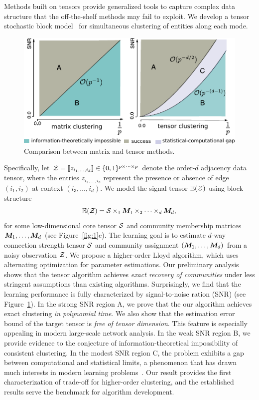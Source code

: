 \documentclass[10pt]{article}
\theoremstyle{plain}
\theoremstyle{definition}
\begin{document}
Methods built on tensors provide generalized tools to capture complex data structure that the off-the-shelf methods may fail to exploit. We develop a tensor stochastic block model~\cite{wang2019multiway,han2020exact} for simultaneous clustering of entities along each mode. 
\begin{figure}
  \vspace{-.3cm}
  \begin{center}
    \includegraphics[width=.4\textwidth]{demo_snr.pdf}
  \end{center}
          \vspace{-.2cm}
    \caption{\scriptsize Comparison between matrix and tensor methods.}\label{fig:2}
        \vspace{-.4cm}
\end{figure} 
Specifically, let $\mathcal{Z}=\llbracket z_{i_1,\ldots,i_d} \rrbracket\in\{0,1\}^{p\times \cdots \times p}$ denote the order-$d$ adjacency data tensor, where the entries $z_{i_1,\ldots,i_d}$ represent the presence or absence of edge $(i_1,i_2)$ at context $(i_3,\ldots,i_d)$. We model the signal tensor $\mathbb{E}(\mathcal{Z})$ using block structure
\[
\mathbb{E}(\mathcal{Z})=\mathcal{S}\times_1\bm M_1\times_2\cdots \times_d\bm M_d,
\]
for some low-dimensional core tensor $\mathcal{S}$ and community membership matrices $\bm M_1,\ldots,\bm M_d$ (see Figure~\ref{fig:1}c). The learning goal is to estimate $d$-way connection strength tensor $\mathcal{S}$ and community assignment $(\bm M_1,\ldots,\bm M_d)$ from a noisy observation $\mathcal{Z}$. We propose a higher-order Lloyd algorithm, which uses alternating optimization for parameter estimations. Our preliminary analysis shows that the tensor algorithm achieves \emph{exact recovery of communities} under less stringent assumptions than existing algorithms. Surprisingly, we find that the learning performance is fully characterized by signal-to-noise ration (SNR) (see Figure~\ref{fig:2}). In the strong SNR region A, we prove that the our algorithm achieves exact clustering \emph{in polynomial time}. We also show that the estimation error bound of the target tensor is \emph{free of tensor dimension}. This feature is especially appealing in modern large-scale network analysis. In the weak SNR region B, we provide evidence to the conjecture of information-theoretical impossibility of consistent clustering. In the modest SNR region C, the problem exhibits a gap between computational and statistical limits, a phenomenon that has drawn much interests in modern learning problems~\cite{berthet2013complexity,brennan2018reducibility,wu202113}. Our result provides the first characterization of trade-off for higher-order clustering, and the established results serve the benchmark for algorithm development. 
\end{document}
